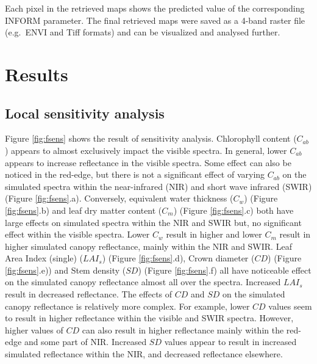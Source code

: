 \documentclass[a4paper, twoside]{templates/ociamthesis}
\begin{document}
Each pixel in the retrieved maps shows the predicted value of the corresponding INFORM parameter. The final retrieved maps were saved as a 4-band raster file (e.g.~ENVI and Tiff formats) and can be visualized and analysed further.

\hypertarget{results}{%
\chapter{Results}\label{results}}

\hypertarget{local-sensitivity-analysis-1}{%
\section{Local sensitivity analysis}\label{local-sensitivity-analysis-1}}

Figure \ref{fig:fsens} shows the result of sensitivity analysis. Chlorophyll content (\(C_{ab}\)) appears to almost exclusively impact the visible spectra. In general, lower \(C_{ab}\) appears to increase reflectance in the visible spectra. Some effect can also be noticed in the red-edge, but there is not a significant effect of varying \(C_{ab}\) on the simulated spectra within the near-infrared (NIR) and short wave infrared (SWIR) (Figure \ref{fig:fsens}.a). Conversely, equivalent water thickness (\(C_{w}\)) (Figure \ref{fig:fsens}.b) and leaf dry matter content (\(C_{m}\)) (Figure \ref{fig:fsens}.c) both have large effects on simulated spectra within the NIR and SWIR but, no significant effect within the visible spectra. Lower \(C_{w}\) result in higher and lower \(C_{m}\) result in higher simulated canopy reflectance, mainly within the NIR and SWIR. Leaf Area Index (single) (\(LAI_{s}\)) (Figure \ref{fig:fsens}.d), Crown diameter (\(CD\)) (Figure \ref{fig:fsens}.e)) and Stem density (\(SD\)) (Figure \ref{fig:fsens}.f) all have noticeable effect on the simulated canopy reflectance almost all over the spectra. Increased \(LAI_{s}\) result in decreased reflectance. The effects of \(CD\) and \(SD\) on the simulated canopy reflectance is relatively more complex. For example, lower \(CD\) values seem to result in higher reflectance within the visible and SWIR spectra. However, higher values of \(CD\) can also result in higher reflectance mainly within the red-edge and some part of NIR. Increased \(SD\) values appear to result in increased simulated reflectance within the NIR, and decreased reflectance elsewhere.

\newpage
\end{document}
